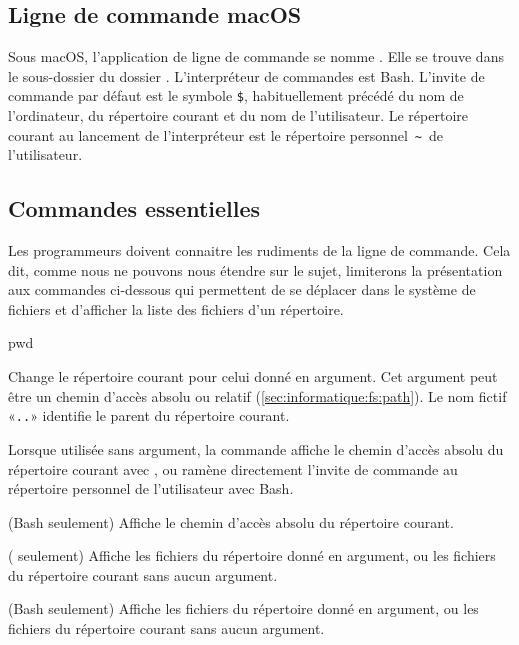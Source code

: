 \subsection{Ligne de commande macOS}
\label{sec:informatique:cli:macos}

Sous macOS, l'application de ligne de commande se nomme
. Elle se trouve dans le sous-dossier
 du dossier . L'interpréteur de
commandes est Bash. L'invite de commande par défaut est le
symbole \verb=$=, habituellement précédé du nom de l'ordinateur, du
répertoire courant et du nom de l'utilisateur. Le répertoire courant
au lancement de l'interpréteur est le répertoire personnel
\,\verb=~=\, de l'utilisateur.


\subsection{Commandes essentielles}
\label{sec:informatique:cli:commandes}

Les programmeurs doivent connaitre les rudiments de la ligne de
commande. Cela dit, comme nous ne pouvons nous étendre sur le sujet,
limiterons la présentation aux commandes ci-dessous qui
permettent de se déplacer dans le système de fichiers et d'afficher
la liste des fichiers d'un répertoire.

\begin{ttscript}{pwd}
\item[\Icode{cd}] Change le répertoire courant pour
  celui donné en argument. Cet argument peut être un chemin d'accès
  absolu ou relatif (\autoref{sec:informatique:fs:path}). Le nom
  fictif «\verb=..=» identifie le parent du répertoire courant.

  Lorsque utilisée sans argument, la commande affiche le chemin
  d'accès absolu du répertoire courant avec , ou ramène
  directement l'invite de commande au répertoire personnel de
  l'utilisateur avec Bash.
\item[\Icode{pwd}] (Bash seulement) Affiche le chemin
  d'accès absolu du répertoire courant.
\item[\Icode{dir}] (
  seulement) Affiche les fichiers du répertoire donné en argument, ou
  les fichiers du répertoire courant sans aucun argument.
\item[\code{ls}]  (Bash
  seulement) Affiche les fichiers du répertoire donné en argument, ou
  les fichiers du répertoire courant sans aucun argument.
\end{ttscript}


